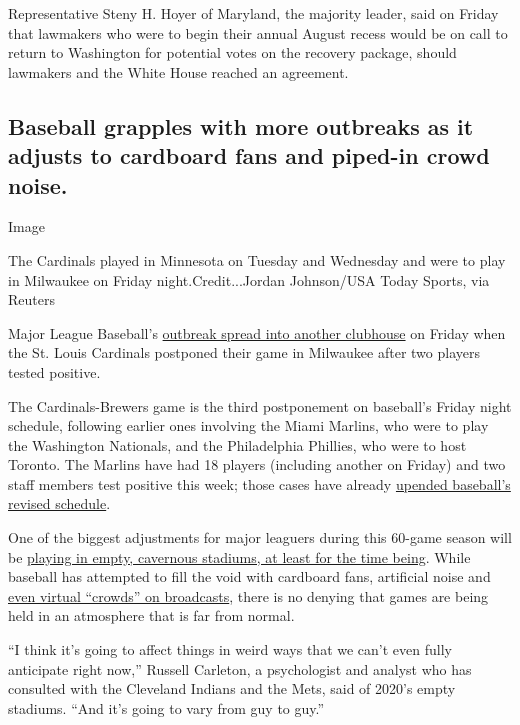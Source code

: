 Representative Steny H. Hoyer of Maryland, the majority leader, said on
Friday that lawmakers who were to begin their annual August recess would
be on call to return to Washington for potential votes on the recovery
package, should lawmakers and the White House reached an agreement.

\hypertarget{baseball-grapples-with-more-outbreaks-as-it-adjusts-to-cardboard-fans-and-piped-in-crowd-noise}{%
\subsection{Baseball grapples with more outbreaks as it adjusts to
cardboard fans and piped-in crowd
noise.}\label{baseball-grapples-with-more-outbreaks-as-it-adjusts-to-cardboard-fans-and-piped-in-crowd-noise}}

Image

The Cardinals played in Minnesota on Tuesday and Wednesday and were to
play in Milwaukee on Friday night.Credit...Jordan Johnson/USA Today
Sports, via Reuters

Major League Baseball's
\href{https://www.nytimes.com/2020/07/31/sports/baseball/cardinals-twins-coronavirus-mlb.html}{outbreak
spread into another clubhouse} on Friday when the St. Louis Cardinals
postponed their game in Milwaukee after two players tested positive.

The Cardinals-Brewers game is the third postponement on baseball's
Friday night schedule, following earlier ones involving the Miami
Marlins, who were to play the Washington Nationals, and the Philadelphia
Phillies, who were to host Toronto. The Marlins have had 18 players
(including another on Friday) and two staff members test positive this
week; those cases have already
\href{https://www.nytimes.com/2020/07/28/sports/baseball/marlins-outbreak-mlb-coronavirus.html}{upended
baseball's revised schedule}.

One of the biggest adjustments for major leaguers during this 60-game
season will be
\href{https://www.nytimes.com/2020/07/31/sports/baseball/baseball-empty-stadiums-effects.html}{playing
in empty, cavernous stadiums, at least for the time being}. While
baseball has attempted to fill the void with cardboard fans, artificial
noise and \href{https://www.youtube.com/watch?v=q_FQcKH4xL4}{even
virtual ``crowds'' on broadcasts}, there is no denying that games are
being held in an atmosphere that is far from normal.

``I think it's going to affect things in weird ways that we can't even
fully anticipate right now,'' Russell Carleton, a psychologist and
analyst who has consulted with the Cleveland Indians and the Mets, said
of 2020's empty stadiums. ``And it's going to vary from guy to guy.''

